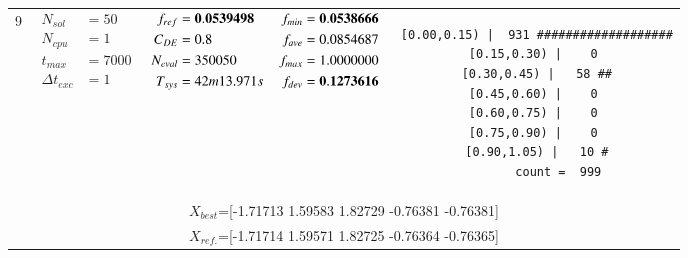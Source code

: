 \begin{table*} [!t]
\begin{tabular}[c]{ccccc}
9
&
{$\!\begin{aligned}
    N_{sol}        &= 50 \\
	N_{cpu}        &= 1 \\
	t_{max}        &= 7000 \\
	\Delta t_{exc} &= 1
\end{aligned}$}
&
{$\!\begin{aligned}
	f_{ref}  &= {\bf 0.0539498} \\
	C_{DE}   &= 0.8 \\
	N_{eval} &= 350050 \\
	T_{sys}  &= 42m13.971s
\end{aligned}$}
&
{$\!\begin{aligned}
    f_{min}  &= {\bf 0.0538666} \\
    f_{ave}  &= 0.0854687 \\
    f_{max}  &= 1.0000000 \\
    f_{dev}  &= {\bf 0.1273616}
\end{aligned}$}
&
\begin{minipage}{4.1cm} \fontsize{5pt}{6pt}
\begin{verbatim}
 [0.00,0.15) |  931 ###################
 [0.15,0.30) |    0 
 [0.30,0.45) |   58 ##
 [0.45,0.60) |    0 
 [0.60,0.75) |    0 
 [0.75,0.90) |    0 
 [0.90,1.05) |   10 #
       count =  999
 \end{verbatim}
\end{minipage} \\
\multicolumn{5}{c}{{\scriptsize $X_{best}$=[-1.71713 1.59583 1.82729 -0.76381 -0.76381]}} \\
\multicolumn{5}{c}{{\scriptsize $X_{ref.}$=[-1.71714 1.59571 1.82725 -0.76364 -0.76365]}} \\



\bottomrule
\end{tabular}
\label{tab:prob2and9}
\end{table*}
